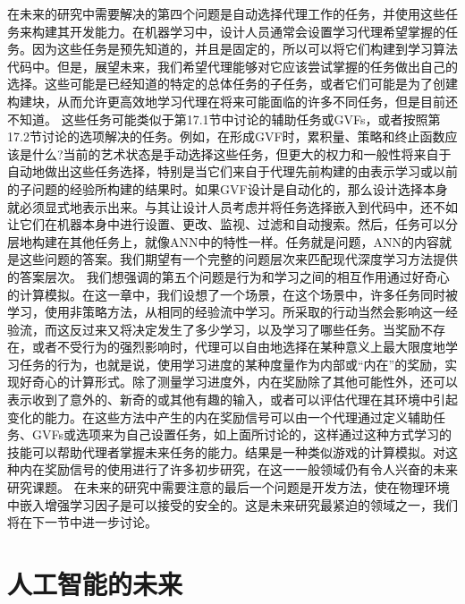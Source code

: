 在未来的研究中需要解决的第四个问题是自动选择代理工作的任务，并使用这些任务来构建其开发能力。在机器学习中，设计人员通常会设置学习代理希望掌握的任务。因为这些任务是预先知道的，并且是固定的，所以可以将它们构建到学习算法代码中。但是，展望未来，我们希望代理能够对它应该尝试掌握的任务做出自己的选择。这些可能是已经知道的特定的总体任务的子任务，或者它们可能是为了创建构建块，从而允许更高效地学习代理在将来可能面临的许多不同任务，但是目前还不知道。
这些任务可能类似于第17.1节中讨论的辅助任务或GVFs，或者按照第17.2节讨论的选项解决的任务。例如，在形成GVF时，累积量、策略和终止函数应该是什么?当前的艺术状态是手动选择这些任务，但更大的权力和一般性将来自于自动地做出这些任务选择，特别是当它们来自于代理先前构建的由表示学习或以前的子问题的经验所构建的结果时。如果GVF设计是自动化的，那么设计选择本身就必须显式地表示出来。与其让设计人员考虑并将任务选择嵌入到代码中，还不如让它们在机器本身中进行设置、更改、监视、过滤和自动搜索。然后，任务可以分层地构建在其他任务上，就像ANN中的特性一样。任务就是问题，ANN的内容就是这些问题的答案。我们期望有一个完整的问题层次来匹配现代深度学习方法提供的答案层次。
我们想强调的第五个问题是行为和学习之间的相互作用通过好奇心的计算模拟。在这一章中，我们设想了一个场景，在这个场景中，许多任务同时被学习，使用非策略方法，从相同的经验流中学习。所采取的行动当然会影响这一经验流，而这反过来又将决定发生了多少学习，以及学习了哪些任务。当奖励不存在，或者不受行为的强烈影响时，代理可以自由地选择在某种意义上最大限度地学习任务的行为，也就是说，使用学习进度的某种度量作为内部或“内在”的奖励，实现好奇心的计算形式。除了测量学习进度外，内在奖励除了其他可能性外，还可以表示收到了意外的、新奇的或其他有趣的输入，或者可以评估代理在其环境中引起变化的能力。在这些方法中产生的内在奖励信号可以由一个代理通过定义辅助任务、GVFs或选项来为自己设置任务，如上面所讨论的，这样通过这种方式学习的技能可以帮助代理者掌握未来任务的能力。结果是一种类似游戏的计算模拟。对这种内在奖励信号的使用进行了许多初步研究，在这一一般领域仍有令人兴奋的未来研究课题。
在未来的研究中需要注意的最后一个问题是开发方法，使在物理环境中嵌入增强学习因子是可以接受的安全的。这是未来研究最紧迫的领域之一，我们将在下一节中进一步讨论。

\section{人工智能的未来}

